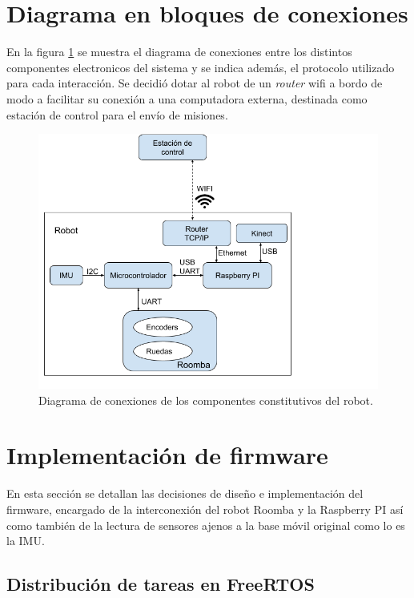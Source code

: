 \section{Diagrama en bloques de conexiones}

En la figura \ref{fig:lubobotComponentes} se muestra el diagrama de conexiones entre los distintos componentes electronicos del sistema y se indica además, el protocolo utilizado para cada interacción. Se decidió dotar al robot de un \textit{router} wifi a bordo de modo a facilitar su conexión a una computadora externa, destinada como estación de control para el envío de misiones.

\begin{figure}[ht]
  \centering
  \includegraphics[scale=0.5]{./Figures/lubobot_conexiones.png}
  \caption{Diagrama de conexiones de los componentes constitutivos del robot.}
  \label{fig:lubobotComponentes}
\end{figure}

\newpage

\section{Implementación de firmware}

En esta sección se detallan las decisiones de diseño e implementación del firmware, encargado de la interconexión del robot Roomba y la Raspberry PI así como también de la lectura de sensores ajenos a la base móvil original como lo es la IMU.

\subsection{Distribución de tareas en FreeRTOS}

